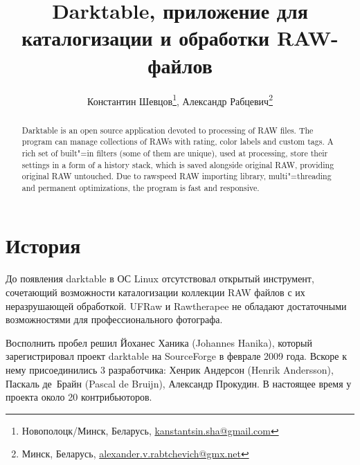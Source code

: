 \documentclass[10pt, a5paper]{article}
\begin{document}
\title{Darktable, приложение для каталогизации и обработки RAW-файлов}
\author{Константин Шевцов\footnote{Новополоцк/Минск, Беларусь, \url{kanstantsin.sha@gmail.com}}, Александр Рабцевич\footnote{Минск, Беларусь, \url{alexander.v.rabtchevich@gmx.net}}}
\date{}

\def\progref!#1!{\texttt{#1}}

\maketitle

\begin{abstract}
Darktable is an open source application devoted to processing of RAW files. The program can manage collections of RAWs with rating, color labels and custom tags. A rich set of built"=in filters (some of them are unique), used at processing, store their settings in a form of a history stack, which is saved alongside original RAW, providing original RAW untouched. Due to rawspeed RAW importing library, multi"=threading and permanent optimizations, the program is fast and responsive.
\end{abstract}

\section*{История}

До появления darktable в ОС Linux отсутствовал открытый инструмент, сочетающий возможности каталогизации коллекции RAW файлов с их неразрушающей обработкой. UFRaw и  Rawtherapee не обладают достаточными возможностями для профессионального фотографа.

Восполнить пробел решил Йоханес Ханика (Johannes Hanika), который зарегистрировал проект darktable на SourceForge в феврале 2009 года. Вскоре к нему присоединились 3 разработчика: Хенрик Андерсон (Henrik Andersson), Паскаль де Брайн (Pascal de Bruijn), Александр Прокудин. В настоящее время у проекта около 20 контрибьюторов. 
\end{document}
